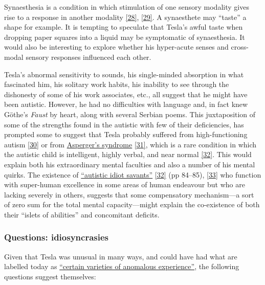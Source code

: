 \documentclass[
  a4paper,
]{article}
\begin{document}
Synaesthesia is a condition in which stimulation of one sensory modality
gives rise to a response in another modality
\protect\hyperlink{ref-marks00}{{[}28{]}},
\protect\hyperlink{ref-cytowic96}{{[}29{]}}. A synaesthete may ``taste''
a shape for example. It is tempting to speculate that Tesla's awful
taste when dropping paper squares into a liquid may be symptomatic of
synaesthesia. It would also be interesting to explore whether his
hyper-acute senses and cross-modal sensory responses influenced each
other.

Tesla's abnormal sensitivity to sounds, his single-minded absorption in
what fascinated him, his solitary work habits, his inability to see
through the dishonesty of some of his work associates, etc., all suggest
that he might have been autistic. However, he had no difficulties with
language and, in fact knew Göthe's \emph{Faust} by heart, along with
several Serbian poems. This juxtaposition of some of the strengths found
in the autistic with few of their deficiencies, has prompted some to
suggest that Tesla probably suffered from high-functioning autism
\protect\hyperlink{ref-blume04}{{[}30{]}} or from
\href{https://en.wikipedia.org/wiki/Asperger_syndrome}{Asperger's
syndrome} \protect\hyperlink{ref-tesla-faq}{{[}31{]}}, which is a rare
condition in which the autistic child is intelligent, highly verbal, and
near normal \protect\hyperlink{ref-frith90}{{[}32{]}}. This would
explain both his extraordinary mental faculties and also a number of his
mental quirks. The existence of
\href{https://en.wikipedia.org/wiki/Savant_syndrome}{``autistic idiot
savants''} \protect\hyperlink{ref-frith90}{{[}32{]}} (pp 84--85),
\protect\hyperlink{ref-savant2009}{{[}33{]}} who function with
super-human excellence in some areas of human endeavour but who are
lacking severely in others, suggests that some compensatory
mechanism---a sort of zero sum for the total mental capacity---might
explain the co-existence of both their ``islets of abilities'' and
concomitant deficits.

\hypertarget{questions-idiosyncrasies}{%
\subsubsection{Questions:
idiosyncrasies}\label{questions-idiosyncrasies}}

Given that Tesla was unusual in many ways, and could have had what are
labelled today as
\href{https://en.wikipedia.org/wiki/Varieties_of_Anomalous_Experience}{``certain
varieties of anomalous experience''}, the following questions suggest
themselves:
\end{document}

